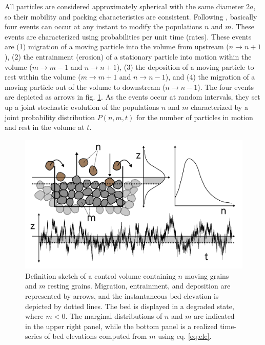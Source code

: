 All particles are considered approximately spherical with the same diameter $2a$, so their mobility and packing characteristics are consistent.
Following \citet{Ancey2008}, basically four events can occur at any instant to modify the populations $n$ and $m$. These events are characterized using probabilities per unit time (rates).
These events are (1) migration of a moving particle into the volume from upstream ($n \rightarrow n+1$), (2) the entrainment (erosion) of a stationary particle into motion within the volume ($m\rightarrow m-1$ and $n\rightarrow n+1$), (3) the deposition of a moving particle to rest within the volume ($m\rightarrow m+1$ and $n\rightarrow n-1$), and (4) the migration of a moving particle out of the volume to downstream ($n\rightarrow n-1$).
The four events are depicted as arrows in fig. \ref{fig:eledefinition}.
As the events occur at random intervals, they set up a joint stochastic evolution of the populations $n$ and $m$ characterized by a joint probability distribution $P(n,m,t)$ for the number of particles in motion and rest in the volume at $t$.
\begin{figure}[!htbp]
	\includegraphics[width=\linewidth,keepaspectratio]{./figures/ch3/improveddef.png}
	\caption{Definition sketch of a control volume containing $n$ moving grains and $m$ resting grains. Migration, entrainment, and deposition are represented by arrows, and the instantaneous bed elevation is depicted by dotted lines. The bed is displayed in a degraded state, where $m<0$. The marginal distributions of $n$ and $m$ are indicated in the upper right panel, while the bottom panel is a realized time-series of bed elevations computed from $m$ using eq. \ref{eq:ele}.}
	\label{fig:eledefinition}
\end{figure}

